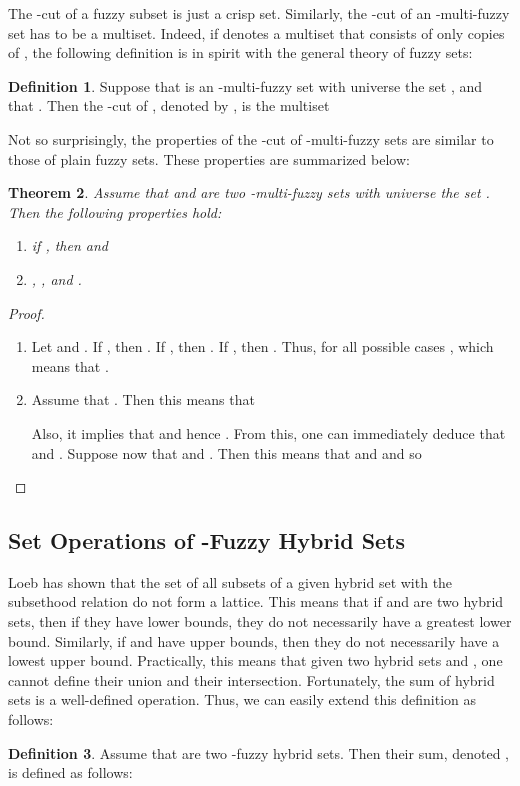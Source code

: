 \documentclass{amsart}
\newtheorem{theorem}{Theorem}[section]
\theoremstyle{definition}
\newtheorem{definition}[theorem]{Definition}
\begin{document}
The -cut of a fuzzy subset is just a crisp set. Similarly, the 
-cut of
an -multi-fuzzy set has to be a multiset. Indeed, if  denotes a
multiset that consists of only  copies of , the following definition 
is in spirit with the general theory of fuzzy sets:
\begin{definition}
Suppose that  is an 
-multi-fuzzy set with universe the set , and
that . Then the -cut of , denoted by
, is the multiset

\end{definition}
Not so surprisingly, the properties of the -cut of -multi-fuzzy sets
are similar to those of plain fuzzy sets. These properties are summarized 
below:
\begin{theorem}\label{alpha-proof}
Assume that  and  are two -multi-fuzzy sets with universe
the set . Then the following properties hold:
\begin{enumerate}
\item if , then  and
\item ,
, and
.
\end{enumerate}
\end{theorem}
\begin{proof}
\begin{enumerate}
\item Let  and . If 
, then 
. 
If , then
.
If , then 
. Thus, for all possible cases  , which means that
.
\item Assume that . Then
this means that

Also, it implies that 
 and hence
. From this,
one can immediately deduce that  and 
. Suppose now that 
 and . Then this means
that  and
 and so

\end{enumerate}
\end{proof}

\subsection{Set Operations of -Fuzzy Hybrid Sets}
Loeb has shown that the set of all subsets of a given hybrid set with the subsethood 
relation do not form a lattice. This means that if
 and  are two hybrid sets, then if they have lower bounds, they do not necessarily
have a greatest lower bound. Similarly, if  and  have upper bounds, then they do not
necessarily have a lowest upper bound. Practically, this means that given two hybrid sets
 and , one cannot define their union and their intersection. Fortunately, the sum
of hybrid sets is a well-defined operation. Thus, we can easily extend this definition
as follows:
\begin{definition}
Assume that  
are two -fuzzy hybrid sets. Then their sum, denoted 
, is defined as follows:

\end{definition}
\end{document}
